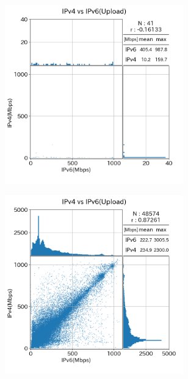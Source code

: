 \begin{figure}[htbp]
\begin{center}
\begin{minipage}[t]{0.48\textwidth}
\begin{center}
\begin{subfigure}[b]{\textwidth}
                    \label{old_CATV_ul}
                \end{subfigure}
                \begin{subfigure}[b]{\textwidth}
                    \centering
                    \includegraphics[width=0.85\textwidth]{fig/old_Mobile_ul.png}
                    \label{old_Mobile_ul}
                \end{subfigure}
            \caption{(1)のアップロードのスループット}
            \label{fig:old_Line_ul}
            \end{center}
        \end{minipage}
        \hfill
        \begin{minipage}[t]{0.48\textwidth}
            \begin{subfigure}[b]{\textwidth}
                \centering
                \includegraphics[width=0.85\textwidth]{fig/new_FTTH_ul.png}

\end{subfigure}
\end{minipage}
\end{center}
\end{figure}
